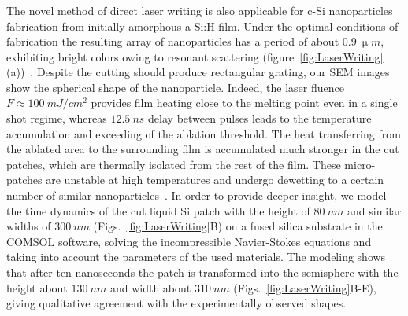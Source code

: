         \subsubsection{}
                The novel method of direct laser writing is also applicable for c-Si nanoparticles fabrication from initially amorphous
            a-Si:H film. Under the optimal conditions of fabrication the resulting array of nanoparticles has a period of about
            $0.9~\si{\upmu m}$, exhibiting bright colors owing to resonant scattering (figure~\ref{fig:LaserWriting}(a))~\cite{krasnok2015towards}.
            Despite the cutting should produce rectangular grating, our SEM images show the spherical shape of the nanoparticle. Indeed,
            the laser fluence $F\approx100~\si{mJ/cm^{2}}$ provides film heating close to the melting point even in a single shot regime,
            whereas $12.5~\si{ns}$ delay between pulses leads to the temperature accumulation and exceeding of the ablation threshold.
            The heat transferring from the ablated area to the surrounding film is accumulated much stronger in the cut patches,
            which are thermally isolated from the rest of the film. These micro-patches are unstable at high temperatures and undergo
            dewetting to a certain number of similar nanoparticles~\cite{thompson2012solid}. In order to provide deeper insight,
            we model the time dynamics of the cut liquid Si patch with the height of $80~\si{nm}$ and similar widths of $300~\si{nm}$ (Figs.~\ref{fig:LaserWriting}B)
            on a fused silica substrate in the COMSOL software, solving the incompressible Navier-Stokes equations and taking into account
            the parameters of the used materials. The modeling shows that after ten nanoseconds the patch is transformed into the semisphere with
            the height about $130~\si{nm}$ and width about $310~\si{nm}$ (Figs.~\ref{fig:LaserWriting}B-E), giving qualitative agreement with
            the experimentally observed shapes.



